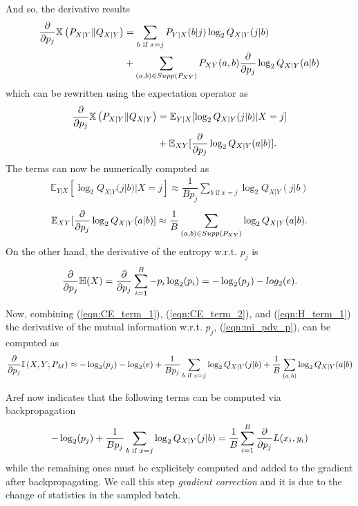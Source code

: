 And so, the derivative results
\begin{align}
	\pdv{p_j} \mathbb{X}\left(P_{X|Y} \Vert Q_{X|Y}\right) &= \sum \limits_{b \text{ if } x=j} P_{Y|X}(b|j) \log_2 Q_{X|Y}(j|b) \\
	& + \sum \limits_{(a,b) \in Supp(P_{XY})} P_{XY}(a, b) \pdv{p_j} \log_2 Q_{X|Y}(a|b)
\end{align}
which can be rewritten using the expectation operator as
\begin{align}
	\pdv{p_j} \mathbb{X}\left(P_{X|Y} \Vert Q_{X|Y}\right) &= \mathbb{E}_{Y|X}[ \log_2 Q_{X|Y}(j|b)| X=j] \\
	& + \mathbb{E}_{XY}[ \pdv{p_j} \log_2 Q_{X|Y}(a|b)].
\end{align}
The terms can now be numerically computed as
\begin{align}
\label{eqn:CE_term_1}
	\mathbb{E}_{Y|X}[ \log_2 Q_{X|Y}(j|b)| X=j] \approx \dfrac{1}{Bp_j}\sum \limits_{b \text{ if } x=j} \log_2 Q_{X|Y}(j|b)
\end{align}
\begin{align}
\label{eqn:CE_term_2}
	\mathbb{E}_{XY}[ \pdv{p_j} \log_2 Q_{X|Y}(a|b)] \approx \dfrac{1}{B} \sum \limits_{(a,b) \in Supp(P_{XY})} \log_2 Q_{X|Y}(a|b).
\end{align}
On the other hand, the derivative of the entropy w.r.t. $p_j$ is
\begin{align}
\label{eqn:H_term_1}
	\pdv{p_j} \mathbb{H}(X) = \pdv{p_j} \sum \limits_{i = 1}^{B} - p_i \log_2(p_i) = - \log_2 (p_j) - log_2 (e).
\end{align}

Now, combining (\ref{eqn:CE_term_1}), (\ref{eqn:CE_term_2}), and (\ref{eqn:H_term_1}) the derivative of the mutual information w.r.t. $p_j$, (\ref{eqn:mi_pdv_p}), can be computed as
\begin{align}
	\pdv{p_j} \mathbb{I} \left(X , Y ; P_M \right) \approx - \log_2 (p_j) - \log_2 (e) + \dfrac{1}{Bp_j}\sum \limits_{b \text{ if } x=j} \log_2 Q_{X|Y}(j|b) + \dfrac{1}{B} \sum \limits_{(a,b)} \log_2 Q_{X|Y}(a|b)
\end{align}

Aref now indicates that the following terms can be computed via backpropagation
\begin{align}
	- \log_2 (p_j) + \dfrac{1}{Bp_j}\sum \limits_{b \text{ if } x=j} \log_2 Q_{X|Y}(j|b) = \dfrac{1}{B} \sum \limits_{i = 1}^{B} \pdv{p_j} L(x_i, y_i)
\end{align}
while the remaining ones must be explicitely computed and added to the gradient after backpropagating. We call this step \textit{gradient correction} and it is due to the change of statistics in the sampled batch.

